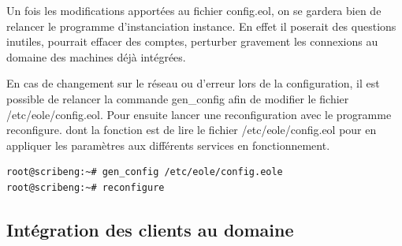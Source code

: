 \documentclass{article}
\begin{document}
Un fois les modifications apportées au fichier config.eol, on se gardera
bien de relancer le programme d'instanciation instance. En effet il
poserait des questions inutiles, pourrait effacer des comptes, perturber
gravement les connexions au domaine des machines déjà intégrées.

En cas de changement sur le réseau ou d'erreur lors de la configuration,
il est possible de relancer la commande gen\_config afin de modifier le
fichier /etc/eole/config.eol. Pour ensuite lancer une reconfiguration
avec le programme reconfigure. dont la fonction est de lire le fichier
/etc/eole/config.eol pour en appliquer les paramètres aux différents
services en fonctionnement.

\begin{lstlisting}
root@scribeng:~# gen_config /etc/eole/config.eole
root@scribeng:~# reconfigure
\end{lstlisting}
\subsection{Intégration des clients au domaine}
\end{document}
